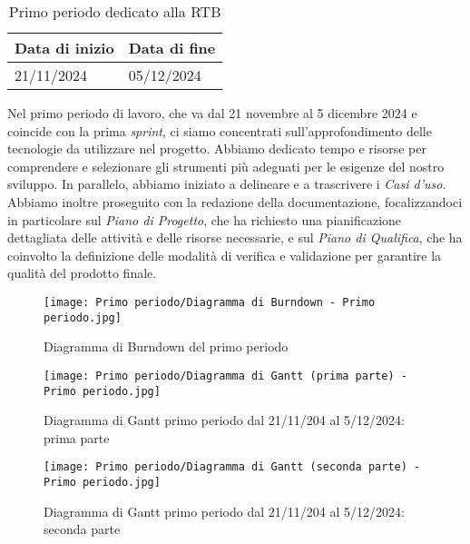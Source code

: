 \begin{table}[h!]
    \centering
    \renewcommand{\arraystretch}{1.5} %
    \begin{tabularx}{\textwidth}{|X|X|}\hline
    \rowcolor[HTML]{FFD700} 
    \textbf{Data di inizio} & \textbf{Data di fine} \\ \hline
    21/11/2024 & 05/12/2024 \\ \hline
    \end{tabularx}
    \caption{Primo periodo dedicato alla RTB}
\end{table}
Nel primo periodo di lavoro, che va dal 21 novembre al 5 dicembre 2024 e coincide con la prima \textit{sprint}, 
ci siamo concentrati sull'approfondimento delle tecnologie da utilizzare nel progetto. 
Abbiamo dedicato tempo e risorse per comprendere e selezionare gli strumenti più adeguati per le esigenze del nostro sviluppo. In parallelo, abbiamo iniziato a delineare e a trascrivere i \textit{Casi d'uso}.
Abbiamo inoltre proseguito con la redazione della documentazione, focalizzandoci in particolare sul \textit{Piano di Progetto}, che ha richiesto una pianificazione dettagliata delle attività e delle risorse necessarie, e sul \textit{Piano di Qualifica}, che ha coinvolto la definizione delle modalità di verifica e validazione per garantire la qualità del prodotto finale.
\newpage
\begin{figure}[h] 
    \centering
    \texttt{[image: Primo periodo/Diagramma di Burndown - Primo periodo.jpg]}
    \caption{Diagramma di Burndown del primo periodo} 
    \label{fig: Diagramma di Burndown del primo periodo}
\end{figure}
\newpage
\begin{figure}[h] 
    \centering
    \texttt{[image: Primo periodo/Diagramma di Gantt (prima parte) - Primo periodo.jpg]}
    \caption{Diagramma di Gantt primo periodo dal 21/11/204 al 5/12/2024: prima parte} 
    \label{fig: Diagramma di Gantt primo periodo dal 21/11/204 al 5/12/2024: prima parte}
\end{figure}
\newpage


\begin{figure}[h] 
    \centering
    \texttt{[image: Primo periodo/Diagramma di Gantt (seconda parte) - Primo periodo.jpg]}
    \caption{Diagramma di Gantt primo periodo dal 21/11/204 al 5/12/2024: seconda parte} 
    \label{fig: Diagramma di Gantt primo periodo dal 21/11/204 al 5/12/2024: seconda parte}
\end{figure}

